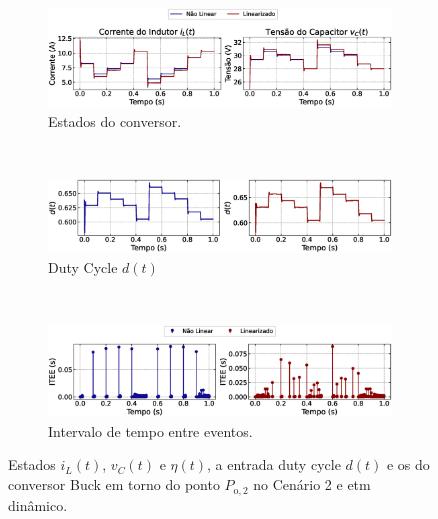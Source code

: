\begin{figure}[H]
  \centering
  \captionsetup{justification=centering}
  \begin{subfigure}{1.\textwidth}
    \centering
    \includegraphics[width=1.\textwidth]{figuras/dynamic-etm/buck/sim2/op2/result.eps}
    \caption{Estados do conversor.}
    \label{fig:buck_converter_variable_pcpl_dynamic_etm_op2_a}
  \end{subfigure}
  \\[6pt]
  \begin{subfigure}{1.\textwidth}
    \centering
    \includegraphics[width=1.\textwidth]{figuras/dynamic-etm/buck/sim2/op2/duty-cycle.eps}
    \caption{Duty Cycle $d(t)$}
    \label{fig:buck_converter_variable_pcpl_dynamic_etm_op2_b}
  \end{subfigure}
  \\[6pt]
  \begin{subfigure}{1.\textwidth}
    \centering
    \includegraphics[width=1.\textwidth]{figuras/dynamic-etm/buck/sim2/op2/inter-event-times.eps}
    \caption{Intervalo de tempo entre eventos.}
    \label{fig:buck_converter_variable_pcpl_dynamic_etm_op2_c}
  \end{subfigure}
  \caption{Estados $i_L(t)$, $v_C(t)$ e $\eta(t)$, a entrada duty cycle $d(t)$ e os  do conversor Buck em torno do ponto $P_{\mathrm{o}, 2}$ no Cenário 2 e \acrshort{etm} dinâmico.}
  \label{fig:buck_converter_variable_pcpl_dynamic_etm_op2}
\end{figure}


